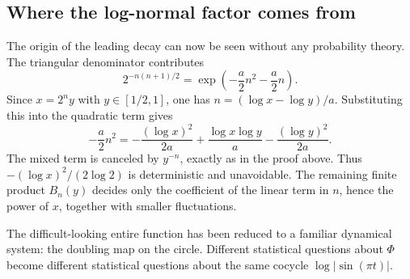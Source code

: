 \documentclass[11pt,oneside]{article}
\numberwithin{equation}{section}
\theoremstyle{definition}
\theoremstyle{remark}
\newcommand{\PhiUp}{\Phi}
\begin{document}
\subsection{Where the log-normal factor comes from}

The origin of the leading decay can now be seen without any probability theory.  The
triangular denominator contributes
\[
 2^{-n(n+1)/2}
 =\exp\!\left(-\frac{a}{2}n^2-\frac{a}{2}n\right).
\]
Since \(x=2^ny\) with \(y\in[1/2,1]\), one has
\(n=(\log x-\log y)/a\).  Substituting this into the quadratic term gives
\begin{equation}
 -\frac{a}{2}n^2
 =-\frac{(\log x)^2}{2a}
   +\frac{\log x\log y}{a}
   -\frac{(\log y)^2}{2a}.
 \label{eq:triangular-to-log-square}
\end{equation}
The mixed term is canceled by \(y^{-n}\), exactly as in the proof above.  Thus
\(- (\log x)^2/(2\log2)\) is deterministic and unavoidable.  The remaining finite product
\(B_n(y)\) decides only the coefficient of the linear term in \(n\), hence the power of
\(x\), together with smaller fluctuations.

\begin{center}
\end{center}

\begin{meaningbox}
The difficult-looking entire function has been reduced to a familiar dynamical system: the
doubling map on the circle.  Different statistical questions about \(\PhiUp\) become
different statistical questions about the same cocycle \(\log|\sin(\pi t)|\).
\end{meaningbox}
\end{document}
